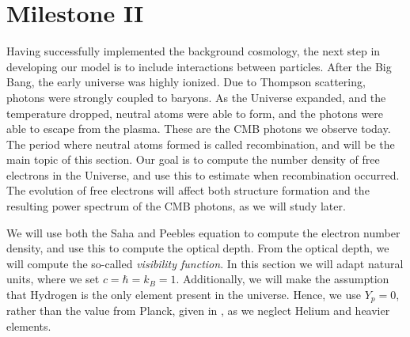 \section{Milestone II}\label{sec:M2}
Having successfully implemented the background cosmology, the next step in 
developing our model is to include interactions between particles. After the Big Bang, the early universe was highly ionized. Due to Thompson scattering, photons were strongly coupled to baryons. As the Universe expanded, and the temperature dropped, neutral atoms were able to form, and the photons were able to escape from the plasma. These are the CMB photons we observe today. The period where neutral atoms formed is called recombination, and will be the main topic of this section. Our goal is to compute the number density of free electrons in the Universe, and use this to estimate when recombination occurred. The evolution of free electrons will affect both structure formation and the resulting power spectrum of the CMB photons, as we will study later.

We will use both the Saha and Peebles equation to compute the electron number density, and use this to compute the optical depth. From the optical depth, we will compute the so-called \textit{visibility function}. In this section we will adapt natural units, where we set $c=\hbar=k_B=1$. Additionally, we will make the assumption that Hydrogen is the only element present in the universe. Hence, we use $Y_p=0$, rather than the value from Planck, given in 
, as we neglect Helium and heavier elements. 





 